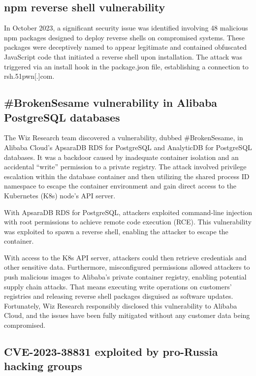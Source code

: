 \subsection*{npm reverse shell vulnerability \cite{npm-vulnerability}}

In October 2023, a significant security issue was identified involving 48 malicious npm packages designed to deploy reverse shells on compromised systems. These packages were deceptively named to appear legitimate and contained obfuscated JavaScript code that initiated a reverse shell upon installation. The attack was triggered via an install hook in the package.json file, establishing a connection to rsh.51pwn[.]com.


\subsection*{\#BrokenSesame vulnerability in Alibaba PostgreSQL databases \cite{BrokenSesame}}

The Wiz Research team discovered a vulnerability, dubbed \#BrokenSesame, in Alibaba Cloud's ApsaraDB RDS for PostgreSQL and AnalyticDB for PostgreSQL databases. It was a backdoor caused by inadequate container isolation and an accidental ``write'' permission to a private registry. The attack involved privilege escalation within the database container and then utilizing the shared process ID namespace to escape the container environment and gain direct access to the Kubernetes (K8s) node's API server.

With ApsaraDB RDS for PostgreSQL, attackers exploited command-line injection with root permissions to achieve remote code execution (RCE). This vulnerability was exploited to spawn a reverse shell, enabling the attacker to escape the container.

With access to the K8s API server, attackers could then retrieve credentials and other sensitive data. Furthermore, misconfigured permissions allowed attackers to push malicious images to Alibaba's private container registry, enabling potential supply chain attacks. That means executing write operations on customers' registries and releasing reverse shell packages disguised as software updates. Fortunately, Wiz Research responsibly disclosed this vulnerability to Alibaba Cloud, and the issues have been fully mitigated without any customer data being compromised.


\subsection*{CVE-2023-38831 exploited by pro-Russia hacking groups \cite{cluster25}}

